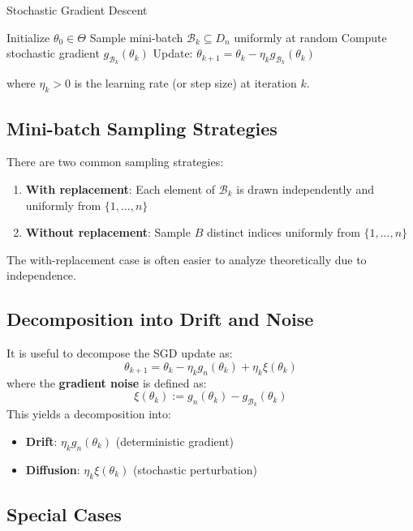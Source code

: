 \documentclass[11pt]{article}
\begin{document}
\begin{algorithm}
\caption{Stochastic Gradient Descent}
\begin{algorithmic}[1]
\State Initialize $\theta_0 \in \Theta$
    \State Sample mini-batch $\mathcal{B}_k \subseteq D_n$ uniformly at random
    \State Compute stochastic gradient $g_{\mathcal{B}_k}(\theta_k)$
    \State Update: $\theta_{k+1} = \theta_k - \eta_k g_{\mathcal{B}_k}(\theta_k)$
\EndFor
\end{algorithmic}
\end{algorithm}

where $\eta_k > 0$ is the learning rate (or step size) at iteration $k$.

\subsection{Mini-batch Sampling Strategies}

There are two common sampling strategies:

\begin{enumerate}
    \item \textbf{With replacement}: Each element of $\mathcal{B}_k$ is drawn independently and uniformly from $\{1, ..., n\}$
    \item \textbf{Without replacement}: Sample $B$ distinct indices uniformly from $\{1, ..., n\}$
\end{enumerate}

The with-replacement case is often easier to analyze theoretically due to independence.

\subsection{Decomposition into Drift and Noise}

It is useful to decompose the SGD update as:
$$\theta_{k+1} = \theta_k - \eta_k g_n(\theta_k) + \eta_k \xi(\theta_k)$$
where the \textbf{gradient noise} is defined as:
$$\xi(\theta_k) := g_n(\theta_k) - g_{\mathcal{B}_k}(\theta_k)$$
This yields a decomposition into:
\begin{itemize}
    \item \textbf{Drift}: $\eta_k g_n(\theta_k)$ (deterministic gradient)
    \item \textbf{Diffusion}: $\eta_k \xi(\theta_k)$ (stochastic perturbation)
\end{itemize}

\subsection{Special Cases}
\end{document}
